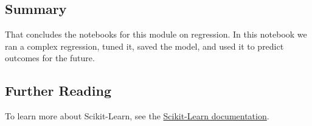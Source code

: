 \documentclass[11pt]{article}
\begin{document}
    \hypertarget{summary}{%
\subsection{Summary}\label{summary}}

That concludes the notebooks for this module on regression. In this
notebook we ran a complex regression, tuned it, saved the model, and
used it to predict outcomes for the future.

\hypertarget{further-reading}{%
\subsection{Further Reading}\label{further-reading}}

To learn more about Scikit-Learn, see the
\href{https://scikit-learn.org/stable/user_guide.html}{Scikit-Learn
documentation}.


    
    
    
\end{document}
